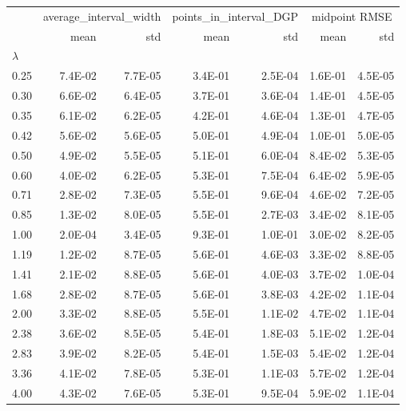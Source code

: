 \begin{tabular}{lrrrrrr}
 & \multicolumn{2}{c}{average_interval_width} & \multicolumn{2}{c}{points_in_interval_DGP} & \multicolumn{2}{c}{midpoint RMSE} \\
 & mean & std & mean & std & mean & std \\
$\lambda$ &  &  &  &  &  &  \\
0.25 & 7.4E-02 & 7.7E-05 & 3.4E-01 & 2.5E-04 & 1.6E-01 & 4.5E-05 \\
0.30 & 6.6E-02 & 6.4E-05 & 3.7E-01 & 3.6E-04 & 1.4E-01 & 4.5E-05 \\
0.35 & 6.1E-02 & 6.2E-05 & 4.2E-01 & 4.6E-04 & 1.3E-01 & 4.7E-05 \\
0.42 & 5.6E-02 & 5.6E-05 & 5.0E-01 & 4.9E-04 & 1.0E-01 & 5.0E-05 \\
0.50 & 4.9E-02 & 5.5E-05 & 5.1E-01 & 6.0E-04 & 8.4E-02 & 5.3E-05 \\
0.60 & 4.0E-02 & 6.2E-05 & 5.3E-01 & 7.5E-04 & 6.4E-02 & 5.9E-05 \\
0.71 & 2.8E-02 & 7.3E-05 & 5.5E-01 & 9.6E-04 & 4.6E-02 & 7.2E-05 \\
0.85 & 1.3E-02 & 8.0E-05 & 5.5E-01 & 2.7E-03 & 3.4E-02 & 8.1E-05 \\
1.00 & 2.0E-04 & 3.4E-05 & 9.3E-01 & 1.0E-01 & 3.0E-02 & 8.2E-05 \\
1.19 & 1.2E-02 & 8.7E-05 & 5.6E-01 & 4.6E-03 & 3.3E-02 & 8.8E-05 \\
1.41 & 2.1E-02 & 8.8E-05 & 5.6E-01 & 4.0E-03 & 3.7E-02 & 1.0E-04 \\
1.68 & 2.8E-02 & 8.7E-05 & 5.6E-01 & 3.8E-03 & 4.2E-02 & 1.1E-04 \\
2.00 & 3.3E-02 & 8.8E-05 & 5.5E-01 & 1.1E-02 & 4.7E-02 & 1.1E-04 \\
2.38 & 3.6E-02 & 8.5E-05 & 5.4E-01 & 1.8E-03 & 5.1E-02 & 1.2E-04 \\
2.83 & 3.9E-02 & 8.2E-05 & 5.4E-01 & 1.5E-03 & 5.4E-02 & 1.2E-04 \\
3.36 & 4.1E-02 & 7.8E-05 & 5.3E-01 & 1.1E-03 & 5.7E-02 & 1.2E-04 \\
4.00 & 4.3E-02 & 7.6E-05 & 5.3E-01 & 9.5E-04 & 5.9E-02 & 1.1E-04 \\
\end{tabular}
